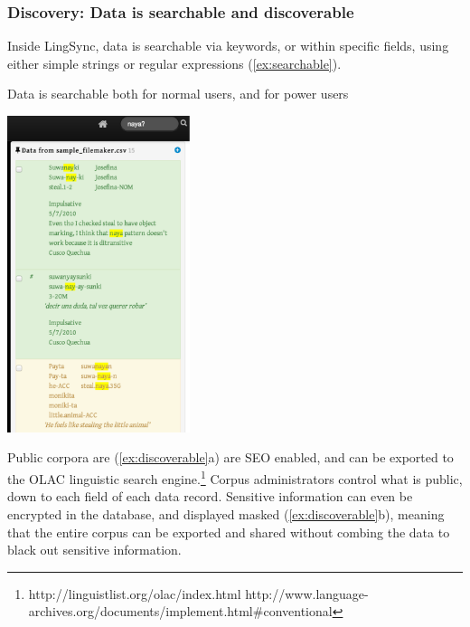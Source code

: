 \documentclass[letterpaper, 12pt, dvips]{mitwpl}
\begin{document}
\subsubsection{\textbf{Discovery}: Data is searchable and discoverable}
 
Inside LingSync, data is searchable via keywords, or within specific fields, using either simple strings or regular expressions (\ref{ex:searchable}). 
\begin{exe} 
\ex Data is searchable both for normal users, and for power users

 \centering
    \includegraphics[width=0.4\textwidth]{searchable}

\label{ex:searchable}
\end{exe}

Public  corpora are   (\ref{ex:discoverable}a) are SEO enabled, and can be exported to the OLAC linguistic search engine.\footnote{ http://linguistlist.org/olac/index.html 
\hspace{.2cm}http://www.language-archives.org/documents/implement.html\#conventional} Corpus administrators  control what is public, down to each field of each data record. Sensitive information can even be encrypted in the database, and displayed masked (\ref{ex:discoverable}b), meaning that the entire corpus can be exported and shared without combing the data to black out sensitive information. 
\end{document}

